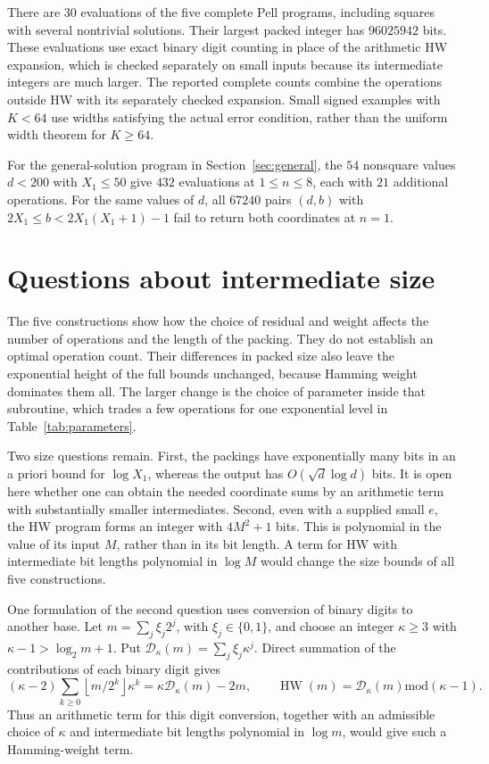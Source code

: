 \documentclass[11pt]{article}
\theoremstyle{remark}
\newcommand{\md}{\mathbin{\mathrm{mod}}}
\newcommand{\fl}[1]{\left\lfloor #1\right\rfloor}
\newcommand{\HW}{\operatorname{HW}}
\begin{document}
There are $30$ evaluations of the five complete Pell programs, including
squares with several nontrivial solutions. Their largest packed integer
has $96025942$ bits. These evaluations use exact binary digit counting
in place of the arithmetic HW expansion, which is checked separately on
small inputs because its intermediate integers are much larger. The
reported complete counts combine the operations outside HW with its
separately checked expansion. Small signed examples with $K<64$ use
widths satisfying the actual error condition, rather than the uniform
width theorem for $K\ge64$.

For the general-solution program in Section~\ref{sec:general}, the $54$
nonsquare values $d<200$ with $X_1\le50$ give $432$ evaluations at
$1\le n\le8$, each with $21$ additional operations. For the same values
of $d$, all $67240$ pairs $(d,b)$ with
$2X_1\le b<2X_1(X_1+1)-1$ fail to return both coordinates at $n=1$.


\section{Questions about intermediate size}\label{sec:questions}

The five constructions show how the choice of residual and weight affects
the number of operations and the length of the packing. They do not
establish an optimal operation count. Their differences in packed size
also leave the exponential height of the full bounds unchanged, because
Hamming weight dominates them all. The larger change is the choice of
parameter inside that subroutine, which trades a few operations for one
exponential level in Table~\ref{tab:parameters}.

Two size questions remain. First, the packings have exponentially many
bits in an a priori bound for $\log X_1$, whereas the output has
$O(\sqrt d\log d)$ bits. It is open here whether one can obtain the
needed coordinate sums by an arithmetic term with substantially smaller
intermediates. Second, even with a supplied small $e$, the HW program
forms an integer with $4M^2+1$ bits. This is polynomial in the value of
its input $M$, rather than in its bit length. A term for HW with
intermediate bit lengths polynomial in $\log M$ would change the size
bounds of all five constructions.

One formulation of the second question uses conversion of binary digits
to another base. Let $m=\sum_j\xi_j2^j$, with $\xi_j\in\{0,1\}$,
and choose an integer $\kappa\ge3$ with
$\kappa-1>\log_2m+1$. Put
$\mathcal D_\kappa(m)=\sum_j\xi_j\kappa^j$.
Direct summation of the contributions of each binary digit gives
\[
  (\kappa-2)\sum_{k\ge0}\fl{m/2^k}\kappa^k
    =\kappa\mathcal D_\kappa(m)-2m,\qquad
  \HW(m)=\mathcal D_\kappa(m)\md(\kappa-1).
\]
Thus an arithmetic term for this digit conversion, together with an
admissible choice of $\kappa$ and intermediate bit lengths polynomial
in $\log m$, would give such a Hamming-weight term.
\end{document}

